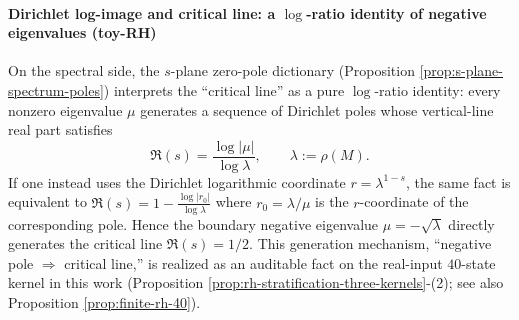 \paragraph{Dirichlet log-image and critical line: a \texorpdfstring{$\log$}{log}-ratio identity of negative eigenvalues (toy-RH)}
On the spectral side, the \(s\)-plane zero-pole dictionary (Proposition \ref{prop:s-plane-spectrum-poles}) interprets the ``critical line'' as a pure \(\log\)-ratio identity: every nonzero eigenvalue \(\mu\) generates a sequence of Dirichlet poles whose vertical-line real part satisfies
\[
\Re(s)=\frac{\log|\mu|}{\log\lambda},
\qquad \lambda:=\rho(M).
\]
If one instead uses the Dirichlet logarithmic coordinate \(r=\lambda^{1-s}\), the same fact is equivalent to
\(
\Re(s)=1-\frac{\log|r_0|}{\log\lambda}
\)
where \(r_0=\lambda/\mu\) is the \(r\)-coordinate of the corresponding pole.
Hence the boundary negative eigenvalue \(\mu=-\sqrt{\lambda}\) directly generates the critical line \(\Re(s)=1/2\).
This generation mechanism, ``negative pole \(\Rightarrow\) critical line,'' is realized as an auditable fact on the real-input \(40\)-state kernel in this work (Proposition \ref{prop:rh-stratification-three-kernels}-(2); see also Proposition \ref{prop:finite-rh-40}).

